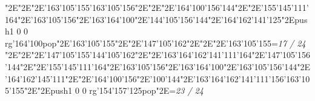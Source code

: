 \null\vfill\enskip\enskip\enskip\ipa\char"2E\enskip\enskip\enskip\ipa\char"2E\enskip\ipa\char"2E\ipa\char'163\ipa\char'105\ipa\char'155\bigskip\ipa\char'163\ipa\char'105\ipa\char'156\ipa\char"2E\enskip\enskip\enskip\ipa\char"2E\enskip\enskip\enskip\enskip\enskip\enskip\bigskip\enskip\enskip\ipa\char"2E\ipa\char'164\ipa\char'100\ipa\char'156\ipa\char'144\ipa\char"2E\enskip\ipa\char"2E\ipa\char'155\ipa\char'145\ipa\char'111\ipa\char'164\ipa\char"2E\ipa\char'163\ipa\char'105\ipa\char'156\ipa\char"2E\ipa\char'163\ipa\char'164\ipa\char'100\ipa\char"2E\ipa\char'144\ipa\char'105\ipa\char'156\ipa\char'144\bigskip\enskip\ipa\char"2E\ipa\char'164\ipa\char'162\ipa\char'141\ipa\char'125\ipa\char"2E\pdfcolorstack\match push{1 0 0 rg}\ipa\char'164\ipa\char'100\pdfcolorstack\match pop{}\ipa\char"2E\ipa\char'163\ipa\char'105\ipa\char'155\ipa\char"2E\enskip\enskip\ipa\char"2E\enskip\enskip\enskip\enskip\enskip\enskip\bigskip\ipa\char'147\ipa\char'105\ipa\char'162\ipa\char"2E\enskip\enskip\ipa\char"2E\enskip\enskip\enskip\ipa\char"2E\ipa\char'163\ipa\char'105\ipa\char'155\bigskip\vfill\footline={\hfill\tenrm\it 17 / 24}\eject
\null\vfill\enskip\enskip\enskip\ipa\char"2E\enskip\enskip\enskip\ipa\char"2E\enskip\ipa\char"2E\ipa\char'147\ipa\char'105\ipa\char'155\bigskip\ipa\char'144\ipa\char'105\ipa\char'162\ipa\char"2E\enskip\enskip\enskip\ipa\char"2E\ipa\char'163\ipa\char'164\ipa\char'162\ipa\char'141\ipa\char'111\ipa\char'164\bigskip\enskip\enskip\ipa\char"2E\ipa\char'147\ipa\char'105\ipa\char'156\ipa\char'144\ipa\char"2E\enskip\ipa\char"2E\ipa\char'155\ipa\char'145\ipa\char'111\ipa\char'164\ipa\char"2E\ipa\char'163\ipa\char'105\ipa\char'156\ipa\char"2E\ipa\char'163\ipa\char'164\ipa\char'100\ipa\char"2E\ipa\char'163\ipa\char'105\ipa\char'156\ipa\char'144\bigskip\enskip\ipa\char"2E\ipa\char'164\ipa\char'162\ipa\char'145\ipa\char'111\ipa\char"2E\enskip\enskip\ipa\char"2E\ipa\char'164\ipa\char'100\ipa\char'156\ipa\char"2E\ipa\char'100\ipa\char'144\ipa\char"2E\ipa\char'163\ipa\char'164\ipa\char'162\ipa\char'141\ipa\char'111\ipa\char'156\bigskip\ipa\char'163\ipa\char'105\ipa\char'155\ipa\char"2E\enskip\enskip\ipa\char"2E\pdfcolorstack\match push{1 0 0 rg}\ipa\char'154\ipa\char'157\ipa\char'125\pdfcolorstack\match pop{}\ipa\char"2E\enskip\enskip\enskip\bigskip\vfill\footline={\hfill\tenrm\it 23 / 24}\eject
